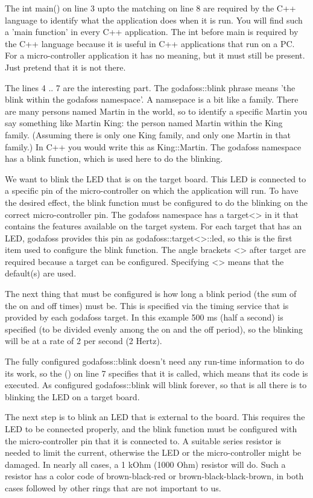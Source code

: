 \documentclass{article}
\begin{document}
The int main(){ on line 3 upto the matching } on line 8 are required
by the C++ language to identify what the application does when it is run.
You will find such a 'main function' in every C++ application. 
The int before main is required by the C++ language because it is 
useful in C++ applications that run on a PC.
For a micro-controller application it has no meaning, but it must still be 
present.
Just pretend that it is not there.

The lines 4 .. 7 are the interesting part.
The godafoss::blink phrase means 'the blink within the godafoss namespace'. 
A namsepace is a bit like a family.
There are many persons named Martin in the world, so to identify a specific
Martin you say something like Martin King: the person named Martin
within the King family. 
(Assuming there is only one King family, and only one
Martin in that family.)
In C++ you would write this as King::Martin.
The godafoss namespace
has a blink function, which is used here to do the blinking.

We want to blink the LED that is on the target board.
This LED is connected to a specific pin of the micro-controller
on which the application will run.
To have the desired effect, the blink function must be configured to 
do the blinking on the correct micro-controller pin. 
The godafoss namespace has a target<> in it that contains the 
features available on the target system.
For each target that has an LED, godafoss provides this pin
as godafoss::target<>::led, so this is the first item used
to configure the blink function.
The angle brackets <> after target are required because a target 
can be configured.
Specifying <> means that the default(s) are used.

The next thing that must be configured is how long a blink period
(the sum of the on and off times) must be.
This is specified via the timing service that is provided by each godafoss target.
In this example 500 ms (half a second) is specified 
(to be divided evenly among the on and the off period), 
so the blinking will be at a rate of 2 per second (2 Hertz).

The fully configured godafoss::blink doesn't need any run-time information 
to do its work, so the () on line 7 specifies that it is called,
which means that its code is executed.
As configured godafoss::blink will blink forever, so that
is all there is to blinking the LED on a target board.

The next step is to blink an LED that is external to the board.
This requires the LED to be connected properly, and 
the blink function must be configured with the micro-controller
pin that it is connected to. 
A suitable series resistor is needed to limit the current,
otherwise the LED or the micro-controller might be damaged.
In nearly all cases, a 1 kOhm (1000 Ohm) resistor will do.
Such a resistor has a color code of brown-black-red 
or brown-black-black-brown,
in both cases followed by other rings that are not important to us.
\end{document}
